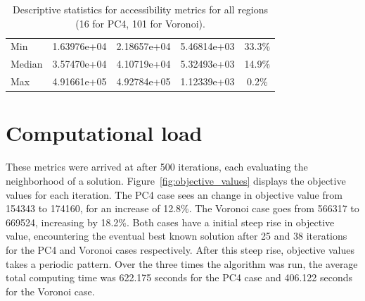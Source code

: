 \begin{table}[h]
\begin{tabular}{l|r|r|r|c}
        Min       & 1.63976e+04                          & 2.18657e+04                        & 5.46814e+03                         & 33.3\%               \\
        Median    & 3.57470e+04                          & 4.10719e+04                        & 5.32493e+03                         & 14.9\%               \\
        Max       & 4.91661e+05                          & 4.92784e+05                        & 1.12339e+03                         & 0.2\%                \\
    \end{tabular}
    \caption{Descriptive statistics for accessibility metrics for all regions (16 for PC4, 101 for Voronoi).}
    \label{tab:descriptions}
\end{table}

\section{Computational load}
These metrics were arrived at after 500 iterations, each evaluating the neighborhood of a solution. Figure~\ref{fig:objective_values} displays the objective values for each iteration. The PC4 case sees an change in objective value from 154343 to 174160, for an increase of 12.8\%. The Voronoi case goes from 566317 to 669524, increasing by 18.2\%. Both cases have a initial steep rise in objective value, encountering the eventual best known solution after 25 and 38 iterations for the PC4 and Voronoi cases respectively. After this steep rise, objective values takes a periodic pattern. Over the three times the algorithm was run, the average total computing time was 622.175 seconds for the PC4 case and 406.122 seconds for the Voronoi case.

